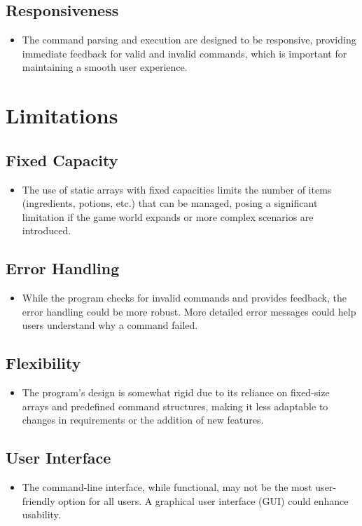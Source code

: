 \documentclass{article}
\begin{document}
\subsection*{Responsiveness}
\begin{itemize}
    \item The command parsing and execution are designed to be responsive, providing immediate feedback for valid and invalid commands, which is important for maintaining a smooth user experience.
\end{itemize}

\section*{Limitations}

\subsection*{Fixed Capacity}
\begin{itemize}
    \item The use of static arrays with fixed capacities limits the number of items (ingredients, potions, etc.) that can be managed, posing a significant limitation if the game world expands or more complex scenarios are introduced.
\end{itemize}

\subsection*{Error Handling}
\begin{itemize}
    \item While the program checks for invalid commands and provides feedback, the error handling could be more robust. More detailed error messages could help users understand why a command failed.
\end{itemize}

\subsection*{Flexibility}
\begin{itemize}
    \item The program's design is somewhat rigid due to its reliance on fixed-size arrays and predefined command structures, making it less adaptable to changes in requirements or the addition of new features.
\end{itemize}

\subsection*{User Interface}
\begin{itemize}
    \item The command-line interface, while functional, may not be the most user-friendly option for all users. A graphical user interface (GUI) could enhance usability.
\end{itemize}
\end{document}
